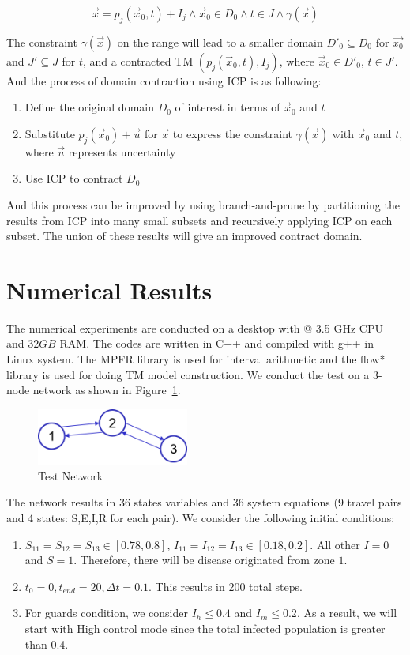 \documentclass[review]{elsarticle}
\theoremstyle{plain}
\theoremstyle{definition}
\theoremstyle{remark}
\numberwithin{equation}{section}
\theoremstyle{remark}
\begin{document}
\begin{equation}
\vec{x}=p_j(\vec{x}_0,t)+I_j \wedge \vec{x}_0\in D_0 \wedge t\in J \wedge \gamma(\vec{x})
\end{equation}

The constraint $\gamma(\vec{x})$ on the range will lead to a smaller domain $D'_0 \subseteq D_0$ for $\vec{x_0}$ and $J'\subseteq J$ for $t$, and a contracted TM $(p_j(\vec{x}_0,t),I_j)$, where $\vec{x}_0\in D'_0$, $t\in J'$. And the process of domain contraction using ICP is as following:

\begin{enumerate}
\item Define the original domain $D_0$ of interest in terms of $\vec{x}_0$ and $t$
\item Substitute $p_j(\vec{x}_0)+\vec{u}$ for $\vec{x}$ to express the constraint $\gamma(\vec{x})$ with $\vec{x}_0$ and $t$, where $\vec{u}$ represents uncertainty
\item Use ICP to contract $D_0$
\end{enumerate}

And this process can be improved by using branch-and-prune by partitioning the results from ICP into many small subsets and recursively applying ICP on each subset. The union of these results will give an improved contract domain.
 
\section{Numerical Results}
The numerical experiments are conducted on a desktop with @ 3.5 GHz CPU and $32GB$ RAM. The codes are written in C++ and compiled with g++ in Linux system. The MPFR library is used for interval arithmetic and the flow* library is used for doing TM model construction. 
We conduct the test on a 3-node network as shown in Figure~\ref{fig:network}.

\begin{figure}[h]
	\centering
	\includegraphics[width=50mm]{network.png}
	\caption{Test Network}
	\label{fig:network}
\end{figure}
The network results in 36 states variables and 36 system equations (9 travel pairs and 4 states: S,E,I,R for each pair). We consider the following initial conditions:
\begin{enumerate}
	\item $S_{11}=S_{12}=S_{13}\in[0.78,0.8]$, $I_{11}=I_{12}=I_{13}\in[0.18,0.2]$. All other $I=0$ and $S=1$. Therefore, there will be disease originated from zone $1$. 
	\item $t_0=0,t_{end}=20, \Delta t=0.1$. This results in 200 total steps. 
	\item For guards condition, we consider $I_h\leq 0.4$ and $I_m \leq 0.2$. As a result, we will start with High control mode since the total infected population is greater than 0.4. 
\end{enumerate}
\end{document}
